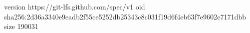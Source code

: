 version https://git-lfs.github.com/spec/v1
oid sha256:2d36a3340e9eadb2f55ce5252db25343c8c031f19d6f4eb63f7e9602c7171dbb
size 190031
